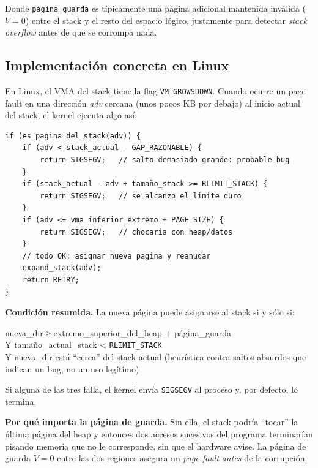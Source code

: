 \documentclass[11pt,a4paper]{article}
\begin{document}
Donde \texttt{página\_guarda} es típicamente una página adicional
mantenida inválida ($V=0$) entre el stack y el resto del espacio
lógico, justamente para detectar \emph{stack overflow} antes de que
se corrompa nada.

\subsection{Implementación concreta en Linux}

En Linux, el VMA del stack tiene la flag \texttt{VM\_GROWSDOWN}.
Cuando ocurre un page fault en una dirección \textit{adv} cercana
(unos pocos KB por debajo) al inicio actual del stack, el kernel
ejecuta algo así:

\begin{lstlisting}[style=cstyle]
if (es_pagina_del_stack(adv)) {
    if (adv < stack_actual - GAP_RAZONABLE) {
        return SIGSEGV;   // salto demasiado grande: probable bug
    }
    if (stack_actual - adv + tamaño_stack >= RLIMIT_STACK) {
        return SIGSEGV;   // se alcanzo el limite duro
    }
    if (adv <= vma_inferior_extremo + PAGE_SIZE) {
        return SIGSEGV;   // chocaria con heap/datos
    }
    // todo OK: asignar nueva pagina y reanudar
    expand_stack(adv);
    return RETRY;
}
\end{lstlisting}

\begin{importante}
\textbf{Condición resumida.} La nueva página puede asignarse al stack
si y sólo si:

\quad nueva\_dir ≥ extremo\_superior\_del\_heap + página\_guarda \\
\quad Y tamaño\_actual\_stack < \texttt{RLIMIT\_STACK} \\
\quad Y nueva\_dir está ``cerca'' del stack actual (heurística contra
saltos absurdos que indican un bug, no un uso legítimo)

Si alguna de las tres falla, el kernel envía \texttt{SIGSEGV} al
proceso y, por defecto, lo termina.
\end{importante}

\textbf{Por qué importa la página de guarda.} Sin ella, el stack
podría ``tocar'' la última página del heap y entonces dos accesos
sucesivos del programa terminarían pisando memoria que no le
corresponde, sin que el hardware avise. La página de guarda
$V=0$ entre las dos regiones asegura un \emph{page fault}
\emph{antes} de la corrupción.

\end{document}
